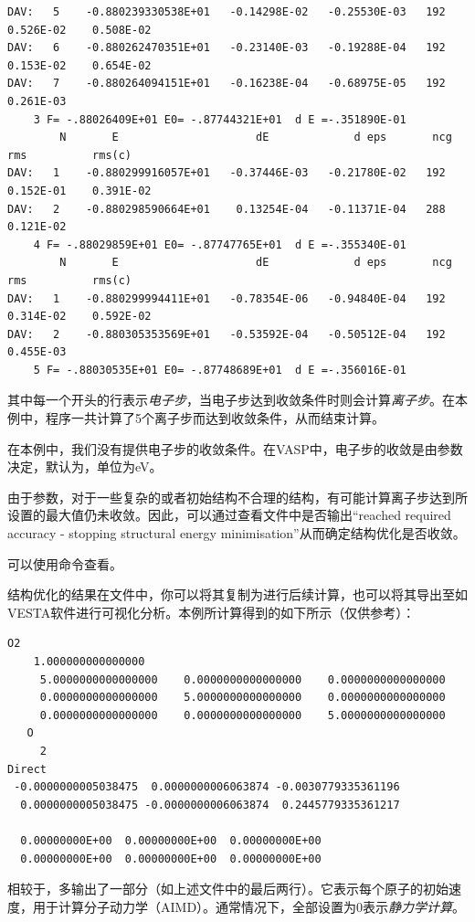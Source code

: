 \begin{lstlisting}[caption=OSZICAR,basicstyle=\tiny]
DAV:   5    -0.880239330538E+01   -0.14298E-02   -0.25530E-03   192   0.526E-02    0.508E-02
DAV:   6    -0.880262470351E+01   -0.23140E-03   -0.19288E-04   192   0.153E-02    0.654E-02
DAV:   7    -0.880264094151E+01   -0.16238E-04   -0.68975E-05   192   0.261E-03
    3 F= -.88026409E+01 E0= -.87744321E+01  d E =-.351890E-01
        N       E                     dE             d eps       ncg     rms          rms(c)
DAV:   1    -0.880299916057E+01   -0.37446E-03   -0.21780E-02   192   0.152E-01    0.391E-02
DAV:   2    -0.880298590664E+01    0.13254E-04   -0.11371E-04   288   0.121E-02
    4 F= -.88029859E+01 E0= -.87747765E+01  d E =-.355340E-01
        N       E                     dE             d eps       ncg     rms          rms(c)
DAV:   1    -0.880299994411E+01   -0.78354E-06   -0.94840E-04   192   0.314E-02    0.592E-02
DAV:   2    -0.880305353569E+01   -0.53592E-04   -0.50512E-04   192   0.455E-03
    5 F= -.88030535E+01 E0= -.87748689E+01  d E =-.356016E-01    
\end{lstlisting}

其中每一个开头的行表示\emph{电子步}，当电子步达到收敛条件时则会计算\emph{离子步}。在本例中，程序一共计算了5个离子步而达到收敛条件，从而结束计算。

\begin{extend}
    在本例中，我们没有提供电子步的收敛条件。在VASP中，电子步的收敛是由参数决定，默认为，单位为eV。
\end{extend}

\begin{attention}
    由于参数，对于一些复杂的或者初始结构不合理的结构，有可能计算离子步达到所设置的最大值仍未收敛。因此，可以通过查看文件中是否输出“reached required accuracy - stopping structural energy minimisation”从而确定结构优化是否收敛。

    可以使用命令查看。
\end{attention}

结构优化的结果在文件中，你可以将其复制为进行后续计算，也可以将其导出至如VESTA软件进行可视化分析。本例所计算得到的如下所示（仅供参考）：

\begin{lstlisting}[caption=CONTCAR]
O2                                      
    1.000000000000000     
     5.0000000000000000    0.0000000000000000    0.0000000000000000
     0.0000000000000000    5.0000000000000000    0.0000000000000000
     0.0000000000000000    0.0000000000000000    5.0000000000000000
   O 
     2
Direct
 -0.0000000005038475  0.0000000006063874 -0.0030779335361196
  0.0000000005038475 -0.0000000006063874  0.2445779335361217
 
  0.00000000E+00  0.00000000E+00  0.00000000E+00
  0.00000000E+00  0.00000000E+00  0.00000000E+00
\end{lstlisting}

\begin{extend}
    相较于，多输出了一部分（如上述文件中的最后两行）。它表示每个原子的初始速度，用于计算分子动力学（AIMD）。通常情况下，全部设置为0表示\emph{静力学计算}。
\end{extend}
